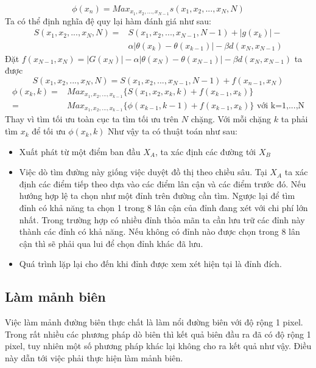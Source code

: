 \documentclass[12pt, oneside, a4]{book}
\begin{document}
\begin{equation*}
\phi(x_n)=Max_{x_1,x_2,...,x_{N-1}} s(x_1,x_2,..., x_N,N)
\end{equation*}
Ta có thể định nghĩa đệ quy lại hàm đánh giá như sau:
\begin{equation*}
\begin{split}
S(x_1,x_2,...,x_N,N)=&S(x_1,x_2,...,x_{N-1},N-1)+ |g(x_k)|-\\&
\alpha|\theta(x_k)-\theta(x_{k-1})|-\beta d(x_N,x_{N-1})
\end{split}
\end{equation*}
Đặt $f(x_{N-1},x_{N})=|G(x_N)|-\alpha|\theta(x_N)-\theta(x_{N-1})|-\beta d(x_N,x_{N-1})$  ta được
\begin{equation}
 S(x_1,x_2,...,x_N,N)=S(x_1,x_2,...,x_{N-1},N-1)+f(x_{n-1},x_{N})
\end{equation}
\begin{equation*}
\begin{split}
\phi(x_k,k)=&Max_{x_1,x_2,...,x_{k-1}}\{S(x_1, x_2, x_k,k)+f(x_{k-1},x_{k})\}\\=&Max_{x_1,x_2,...,x_{k-1}}\{\phi(x_{k-1},k-1)+f(x_{k-1},x_{k})\} \text{ với k=1,...,N}
\end{split}
\end{equation*}
Thay vì tìm tối ưu toàn cục ta tìm tối ưu trên $N$ chặng. Với mỗi chặng $k$ ta phải tìm $x_k$ để tối ưu $\phi(x_k,k)$
Như vậy ta có thuật toán như sau:
\begin{itemize}
\item Xuất phát từ một điểm ban đầu $X_A$, ta xác định các đường tới $X_B$
\item Việc dò tìm đường này giống việc duyệt đồ thị theo chiều sâu. Tại $X_A$ ta xác định các điểm tiếp theo dựa vào các điểm lân cận và các điểm trước đó. Nếu hướng hợp lệ ta chọn như một đỉnh trên đường cần tìm. Ngược lại để tìm đỉnh có khả năng ta chọn 1 trong 8 lân cận của đỉnh đang xét với chi phí lớn nhất. Trong trường hợp có nhiều đỉnh thỏa mãn ta cần lưu trữ các đỉnh này thành các đỉnh có khả năng. Nếu không có đỉnh nào được chọn trong 8 lân cận thì  sẽ phải qua lui để chọn đỉnh khác đã lưu.
\item Quá trình lặp lại cho đến khi đỉnh được xem xét hiện tại là đỉnh đích.
\end{itemize}
\subsection{Làm mảnh biên}
Việc làm mảnh đường biên thực chất là làm nổi đường biên với độ rộng 1 pixel. Trong rất nhiều các phương pháp dò biên thì kết quả biên đầu ra đã có độ rộng 1 pixel, tuy nhiên một số phương pháp khác lại không cho ra kết quả như vậy. Điều này dẫn tới việc phải thực hiện làm mảnh biên.
\end{document}
